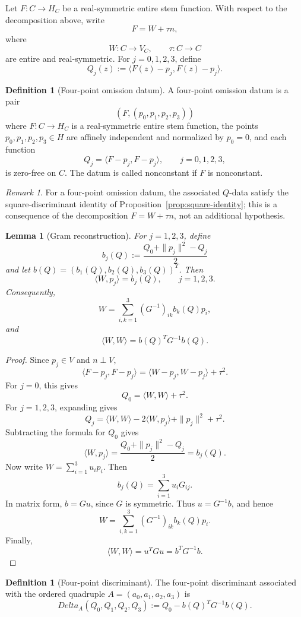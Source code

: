 \documentclass[11pt]{amsart}
\def\HH{H}%
\def\HHc{H_C}%
\def\CC{C}%
\def\DeltaA{Delta_A}%
\numberwithin{equation}{section}
\newtheorem{lemma}[theorem]{Lemma}
\theoremstyle{definition}
\newtheorem{definition}[theorem]{Definition}
\theoremstyle{remark}
\newtheorem{remark}[theorem]{Remark}
\newcommand{\HH}{\mathbb H}
\newcommand{\CC}{\mathbb C}
\newcommand{\HHc}{\mathbb H_{\mathbb C}}
\newcommand{\DeltaA}{\Delta_A}
\begin{document}
Let $F:\CC\to\HHc$ be a real-symmetric entire stem function. With respect to the decomposition above, write
\[
F=W+\tau n,
\]
where
\[
W:\CC\to V_{\CC},\qquad \tau:\CC\to\CC
\]
are entire and real-symmetric. For $j=0,1,2,3$, define
\[
Q_j(z):=\langle F(z)-p_j,F(z)-p_j\rangle.
\]

\begin{definition}[Four-point omission datum]\label{def:omission-datum}
A four-point omission datum is a pair
\[
(F,(p_0,p_1,p_2,p_3))
\]
where $F:\CC\to\HHc$ is a real-symmetric entire stem function, the points $p_0,p_1,p_2,p_3\in\HH$ are affinely independent and normalized by $p_0=0$, and each function
\[
Q_j=\langle F-p_j,F-p_j\rangle,
\qquad j=0,1,2,3,
\]
is zero-free on $\CC$.  The datum is called nonconstant if $F$ is nonconstant.
\end{definition}

\begin{remark}
For a four-point omission datum, the associated $Q$-data satisfy the square-discriminant identity of Proposition~\ref{prop:square-identity}; this is a consequence of the decomposition $F=W+\tau n$, not an additional hypothesis.
\end{remark}

\begin{lemma}[Gram reconstruction]\label{lem:gram}
For $j=1,2,3$, define
\[
b_j(Q):=\frac{Q_0+\|p_j\|^2-Q_j}{2}
\]
and let $b(Q)=(b_1(Q),b_2(Q),b_3(Q))^T$. Then
\[
\langle W,p_j\rangle=b_j(Q),\qquad j=1,2,3.
\]
Consequently,
\[
W=\sum_{i,k=1}^3(G^{-1})_{ik}b_k(Q)p_i,
\]
and
\[
\langle W,W\rangle=b(Q)^TG^{-1}b(Q).
\]
\end{lemma}

\begin{proof}
Since $p_j\in V$ and $n\perp V$,
\[
\langle F-p_j,F-p_j\rangle=\langle W-p_j,W-p_j\rangle+\tau^2.
\]
For $j=0$, this gives
\[
Q_0=\langle W,W\rangle+\tau^2.
\]
For $j=1,2,3$, expanding gives
\[
Q_j=\langle W,W\rangle-2\langle W,p_j\rangle+\|p_j\|^2+\tau^2.
\]
Subtracting the formula for $Q_0$ gives
\[
\langle W,p_j\rangle=\frac{Q_0+\|p_j\|^2-Q_j}{2}=b_j(Q).
\]
Now write $W=\sum_{i=1}^3u_ip_i$. Then
\[
b_j(Q)=\sum_{i=1}^3u_iG_{ij}.
\]
In matrix form, $b=Gu$, since $G$ is symmetric. Thus $u=G^{-1}b$, and hence
\[
W=\sum_{i,k=1}^3(G^{-1})_{ik}b_k(Q)p_i.
\]
Finally,
\[
\langle W,W\rangle=u^TGu=b^TG^{-1}b.
\]
\end{proof}

\begin{definition}[Four-point discriminant]
The four-point discriminant associated with the ordered quadruple $A=(a_0,a_1,a_2,a_3)$ is
\[
\DeltaA(Q_0,Q_1,Q_2,Q_3):=Q_0-b(Q)^TG^{-1}b(Q).
\]
\end{definition}
\end{document}
